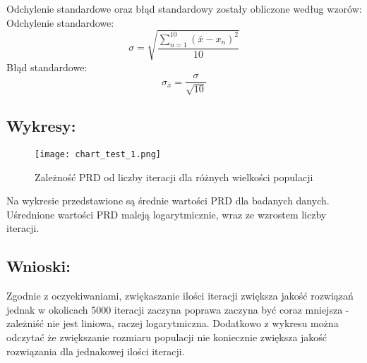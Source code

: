   Odchylenie standardowe oraz błąd standardowy zostały obliczone według wzorów: \\
    Odchylenie standardowe:
    \[ \sigma = \sqrt{\frac{\sum_{n = 1}^{10}(\bar{x} - x_n)^2}{10}} \]
    Błąd standardowe:
    \[ \sigma_{\bar{x}} = \frac{\sigma}{\sqrt{10}} \]

  \subsection{Wykresy: }
    \begin{figure}[H]
      \texttt{[image: chart\_test\_1.png]}
      \centering
      \caption{Zależność PRD od liczby iteracji dla różnych wielkości populacji}
    \end{figure}
  
  Na wykresie przedstawione są średnie wartości PRD dla badanych danych. Uśrednione wartości PRD maleją logarytmicznie, wraz ze wzrostem liczby iteracji.

  \subsection{Wnioski: }
  Zgodnie z oczyekiwaniami, zwiękaszanie ilości iteracji zwiększa jakość rozwiązań jednak w okolicach 5000 iteracji zaczyna poprawa zaczyna być coraz mniejsza - zależniść nie jest liniowa, raczej logarytmiczna. Dodatkowo z wykresu można odczytać że zwiększanie rozmiaru populacji nie koniecznie zwiększa jakość rozwiązania dla jednakowej ilości iteracji.
  

